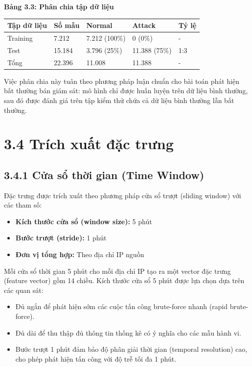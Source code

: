 \documentclass[
  a4paper]{report}
\newcounter{none} %
\providecommand{\tightlist}{%
  \setlength{\itemsep}{0pt}\setlength{\parskip}{0pt}}
\begin{document}
\textbf{Bảng 3.3: Phân chia tập dữ liệu}

{\def\LTcaptype{none} %
\begin{longtable}[]{@{}lllll@{}}
\toprule\noalign{}
Tập dữ liệu & Số mẫu & Normal & Attack & Tỷ lệ \\
\midrule\noalign{}
\endhead
\bottomrule\noalign{}
\endlastfoot
Training & 7.212 & 7.212 (100\%) & 0 (0\%) & - \\
Test & 15.184 & 3.796 (25\%) & 11.388 (75\%) & 1:3 \\
Tổng & 22.396 & 11.008 & 11.388 & - \\
\end{longtable}
}

Việc phân chia này tuân theo phương pháp luận chuẩn cho bài toán phát
hiện bất thường bán giám sát: mô hình chỉ được huấn luyện trên dữ liệu
bình thường, sau đó được đánh giá trên tập kiểm thử chứa cả dữ liệu bình
thường lẫn bất thường.

\section{3.4 Trích xuất đặc
trưng}\label{truxedch-xuux1ea5t-ux111ux1eb7c-trux1b0ng}

\subsection{3.4.1 Cửa sổ thời gian (Time
Window)}\label{cux1eeda-sux1ed5-thux1eddi-gian-time-window}

Đặc trưng được trích xuất theo phương pháp cửa sổ trượt (sliding window)
với các tham số:

\begin{itemize}
\tightlist
\item
  \textbf{Kích thước cửa sổ (window size):} 5 phút
\item
  \textbf{Bước trượt (stride):} 1 phút
\item
  \textbf{Đơn vị tổng hợp:} Theo địa chỉ IP nguồn
\end{itemize}

Mỗi cửa sổ thời gian 5 phút cho mỗi địa chỉ IP tạo ra một vector đặc
trưng (feature vector) gồm 14 chiều. Kích thước cửa sổ 5 phút được lựa
chọn dựa trên các quan sát:

\begin{itemize}
\tightlist
\item
  Đủ ngắn để phát hiện sớm các cuộc tấn công brute-force nhanh (rapid
  brute-force).
\item
  Đủ dài để thu thập đủ thông tin thống kê có ý nghĩa cho các mẫu hành
  vi.
\item
  Bước trượt 1 phút đảm bảo độ phân giải thời gian (temporal resolution)
  cao, cho phép phát hiện tấn công với độ trễ tối đa 1 phút.
\end{itemize}
\end{document}
